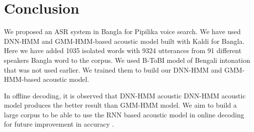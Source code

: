 \documentclass{standalone}
\begin{document}
\chapter{Conclusion}

We proposed an ASR system in Bangla for Pipilika voice search. We have used DNN-HMM and GMM-HMM-based acoustic model built with Kaldi for Bangla. Here we have added 1035 isolated words with 9324 utterances from 91 different speakers  Bangla word to the corpus. We used B-ToBI model of Bengali intonation that was not used earlier. We trained them to build our DNN-HMM and GMM-HMM-based acoustic model.


\par In offline decoding, it is observed that DNN-HMM acoustic DNN-HMM acoustic model produces the better result than GMM-HMM model. We aim to build a large corpus to be able to use the RNN based acoustic model in online decoding for future improvement in accuracy \cite{sak2014long, graves2013speech, bickerton1994speech}.
\\
\end{document}
